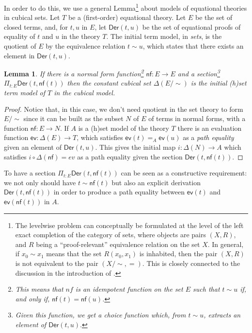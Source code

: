 \documentclass[10pt,a4paper]{article}
\newtheorem{lemma}[theorem]{Lemma}
\theoremstyle{definition}
\theoremstyle{remark}
\newcommand{\Der}{\mathsf{Der}}
\newcommand{\ev}{\mathsf{ev}}
\newcommand{\nf}{\mathsf{nf}}
\begin{document}
In order to do this, we use a general Lemma\footnote{The levelwise problem can conceptually be formulated at the level of the left exact
completion of the category of sets, where objects are pairs $(X,R)$, and $R$ being a ``proof-relevant'' equivalence relation on the set $X$.
In general, if $x_0\sim x_1$ means that the set $R(x_0,x_1)$ is inhabited, then the pair $(X,R)$ is not equivalent to the pair $(X/\sim,=)$.
This is closely connected to the discussion in the introduction of \cite{shulman21}.}
about models of equational theories in cubical sets. Let $T$
be a (first-order) equational theory. Let $E$ be the set of closed terms, and, for $t,u$ in $E$, let $\Der(t,u)$ be the set
of equational proofs of equality of $t$ and $u$ in the theory $T$. The initial term model, in {\em sets}, is the quotient of $E$
by the equivalence relation $t\sim u$, which states that there exists an element in $\Der(t,u)$.


\begin{lemma}\label{norm}
  If there is a normal form function\footnote{This means that $nf$ is an idempotent function on the set $E$ such that
  $t\sim u$ if, and only if, $\nf(t) = \nf(u)$.} $\nf:E\rightarrow E$ and a section\footnote{Given this function, we get a choice
  function which, from $t\sim u$, extracts an element of $\Der(t,u).$} $\Pi_{t:E}\Der(t,\nf(t))$ then the constant cubical
  set $\Delta(E/\sim)$ is the initial (h)set term model of $T$ in the cubical model.
\end{lemma}

\begin{proof}
Notice that, in this case, we don't need quotient
in the set theory to form $E/\sim$ since it can be built as the subset $N$ of $E$ of terms in normal forms, with a function
$\nf:E\rightarrow N$. If $A$ is a (h)set model of the theory $T$ there is an evaluation function $\ev:\Delta(E)\rightarrow T$, which
satisfies $\ev(t) =_A \ev(u)$ as a {\em path equality} given an element of $\Der(t,u)$.
This gives the initial map $i:\Delta(N)\rightarrow A$ which satisfies $i\circ \Delta(\nf) = ev$ as a path equality given the section
$\Der(t,\nf(t))$.
\end{proof}

To have a section $\Pi_{t:E}\Der(t,\nf(t))$ can be seen as a constructive requirement: we not only should have $t\sim \nf(t)$ but also
an explicit derivation $\Der(t,\nf(t))$ in order to produce a path equality between $\ev(t)$ and $\ev(\nf(t))$ in $A$.
\end{document}
